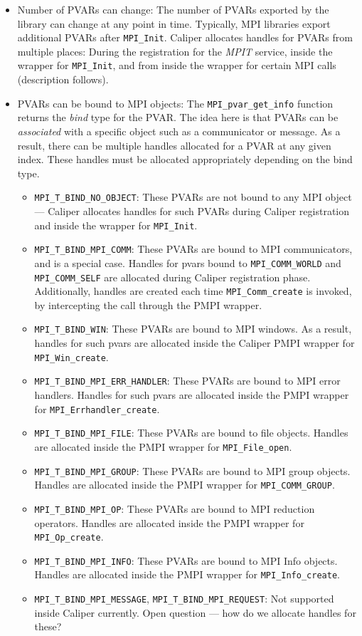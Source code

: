 \begin{itemize}
	\item Number of PVARs can change: The number of PVARs exported by the library can change at any point in time. Typically, MPI libraries export additional PVARs after \verb+MPI_Init+. Caliper allocates handles for PVARs from multiple places: During the registration for the \emph{MPIT} service, inside the wrapper for \verb+MPI_Init+, and from inside the wrapper for certain MPI calls (description follows).
	\item PVARs can be bound to MPI objects: The \verb+MPI_pvar_get_info+ function returns the \emph{bind} type for the PVAR. The idea here is that PVARs can be \emph{associated} with a specific object such as a communicator or message. As a result, there can be multiple handles allocated for a PVAR at any given index. These handles must be allocated appropriately depending on the bind type.
		\begin{itemize}
			\item \verb+MPI_T_BIND_NO_OBJECT+: These PVARs are not bound to any MPI object --- Caliper allocates handles for such PVARs during Caliper registration and inside the wrapper for \verb+MPI_Init+.
			\item \verb+MPI_T_BIND_MPI_COMM+: These PVARs are bound to MPI communicators, and is a special case. Handles for pvars bound to \verb+MPI_COMM_WORLD+ and \verb+MPI_COMM_SELF+ are allocated during Caliper registration phase. Additionally, handles are created each time \verb+MPI_Comm_create+ is invoked, by intercepting the call through the PMPI wrapper.
			\item \verb+MPI_T_BIND_WIN+: These PVARs are bound to MPI windows. As a result, handles for such pvars are allocated inside the Caliper PMPI wrapper for \verb+MPI_Win_create+.
			\item \verb+MPI_T_BIND_MPI_ERR_HANDLER+: These PVARs are bound to MPI error handlers. Handles for such pvars are allocated inside the PMPI wrapper for \verb+MPI_Errhandler_create+.
			\item \verb+MPI_T_BIND_MPI_FILE+: These PVARs are bound to file objects. Handles are allocated inside the PMPI wrapper for \verb+MPI_File_open+.
			\item \verb+MPI_T_BIND_MPI_GROUP+: These PVARs are bound to MPI group objects. Handles are allocated inside the PMPI wrapper for \verb+MPI_COMM_GROUP+.
			\item \verb+MPI_T_BIND_MPI_OP+: These PVARs are bound to MPI reduction operators. Handles are allocated inside the PMPI wrapper for \verb+MPI_Op_create+.
			\item \verb+MPI_T_BIND_MPI_INFO+: These PVARs are bound to MPI Info objects. Handles are allocated inside the PMPI wrapper for \verb+MPI_Info_create+.
			\item \verb+MPI_T_BIND_MPI_MESSAGE+, \verb+MPI_T_BIND_MPI_REQUEST+: Not supported inside Caliper currently. Open question --- how do we allocate handles for these?
		\end{itemize}
\end{itemize}
